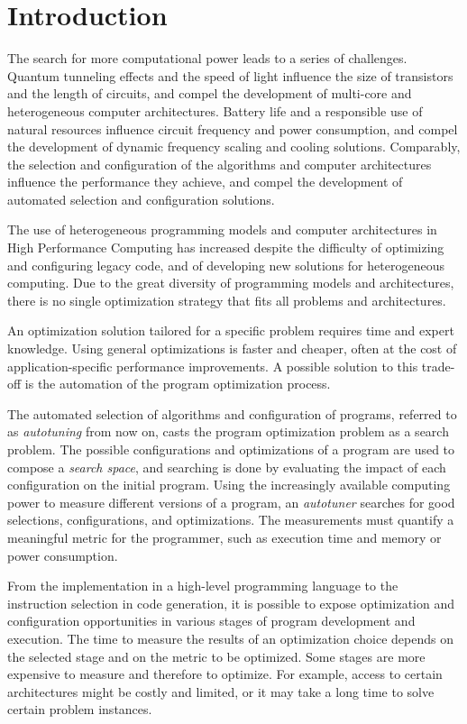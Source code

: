 \chapter{Introduction}
\label{chap:introduction}

The search for more computational power leads to a series of challenges.
Quantum tunneling effects and the speed of light influence the size of
transistors and the length of circuits, and compel the development of
multi-core and heterogeneous computer architectures.  Battery life and a
responsible use of natural resources influence circuit frequency and power
consumption, and compel the development of dynamic frequency scaling and
cooling solutions.  Comparably, the selection and configuration of the
algorithms and computer architectures influence the performance they achieve,
and compel the development of automated selection and configuration solutions.

The use of heterogeneous programming models and computer architectures in High
Performance Computing has increased despite the difficulty of optimizing and
configuring legacy code, and of developing new solutions for heterogeneous
computing. Due to the great diversity of programming models and architectures,
there is no single optimization strategy that fits all problems and
architectures.

An optimization solution tailored for a specific problem requires time and
expert knowledge. Using general optimizations is faster and cheaper, often at
the cost of application-specific performance improvements. A possible solution
to this trade-off is the automation of the program optimization process.

The automated selection of algorithms and configuration of programs, referred
to as \textit{autotuning} from now on, casts the program optimization problem
as a search problem. The possible configurations and optimizations of a program
are used to compose a \textit{search space}, and searching is done by
evaluating the impact of each configuration on the initial program.  Using the
increasingly available computing power to measure different versions of a
program, an \textit{autotuner} searches for good selections, configurations,
and optimizations. The measurements must quantify a meaningful metric for the
programmer, such as execution time and memory or power consumption.

From the implementation in a high-level programming language to the instruction
selection in code generation, it is possible to expose optimization and
configuration opportunities in various stages of program development and
execution.  The time to measure the results of an optimization choice depends
on the selected stage and on the metric to be optimized.
Some stages are more expensive to measure and therefore to optimize.
For example, access to certain architectures might be costly and limited,
or it may take a long time to solve certain problem instances.

